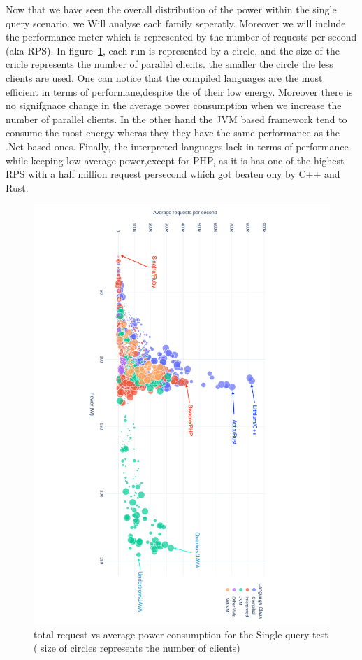 Now that we have seen the overall distribution of the power within the single query scenario. we Will analyse each family seperatly. Moreover we will include the performance meter which is represented by the number of requests per second (aka RPS).
In figure~\ref{fig:power_requests_db}, each run is represented by a circle, and the size of the cricle represents the number of parallel clients. the smaller the circle the less clients are used.
One can notice that the compiled languages are the most efficient in terms of performane,despite the of their low energy. Moreover there is no signifgnace change in the average power consumption when we increase the number of parallel clients. In the other hand the JVM based framework tend to consume the most energy wheras they they have the same performance as the .Net based ones.
Finally, the interpreted languages lack in terms of performance while keeping low average power,except for PHP, as it is has one of the highest RPS with a half million request persecond which got beaten ony by C++ and Rust.

\begin{figure}[hbt]
    \caption{total request vs average power consumption for the Single query test ( size of circles represents the number of clients)}
    \label{fig:power_requests_db}
    \includegraphics[width=
        \columnwidth,angle=9
        0]{imgs/power_requests_db}

\end{figure}

